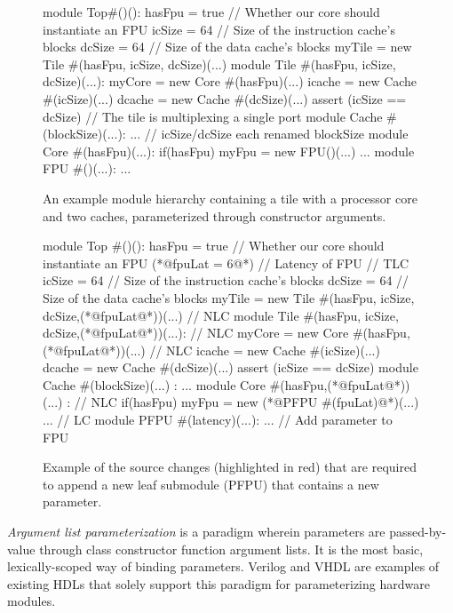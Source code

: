 \begin{figure}
\centering
\begin{phdl}
module Top#()():
  hasFpu = true  // Whether our core should instantiate an FPU
  icSize = 64    // Size of the instruction cache's blocks
  dcSize = 64    // Size of the data cache's blocks
  myTile = new Tile #(hasFpu, icSize, dcSize)(...)
module Tile #(hasFpu, icSize, dcSize)(...):
  myCore = new Core  #(hasFpu)(...)
  icache = new Cache #(icSize)(...)
  dcache = new Cache #(dcSize)(...)
  assert (icSize == dcSize)         // The tile is multiplexing a single port
module Cache #(blockSize)(...): ... // icSize/dcSize each renamed blockSize
module Core #(hasFpu)(...):
  if(hasFpu) myFpu = new FPU()(...) ...
module FPU #()(...): ...
\end{phdl} 
\caption[An example module hierarchy.]{
An example module hierarchy containing a tile with a processor core and two caches, parameterized through constructor arguments.}
\label{fig:arglist}
\end{figure}

\begin{figure}
\centering
\begin{phdl}
module Top #()():
  hasFpu = true  // Whether our core should instantiate an FPU
  (*@\textcolor[rgb]{1,0,0}{fpuLat = 6}@*)     // Latency of FPU                               // TLC
  icSize = 64    // Size of the instruction cache's blocks
  dcSize = 64    // Size of the data cache's blocks
  myTile = new Tile #(hasFpu, icSize, dcSize,(*@\textcolor[rgb]{1,0,0}{fpuLat}@*))(...)        // NLC
module Tile #(hasFpu, icSize, dcSize,(*@\textcolor[rgb]{1,0,0}{fpuLat}@*))(...):               // NLC
  myCore = new Core  #(hasFpu, (*@\textcolor[rgb]{1,0,0}{fpuLat}@*))(...)                      // NLC
  icache = new Cache #(icSize)(...)
  dcache = new Cache #(dcSize)(...)
  assert (icSize == dcSize) 
module Cache #(blockSize)(...) : ... 
module Core #(hasFpu,(*@\textcolor[rgb]{1,0,0}{fpuLat}@*))(...) :                              // NLC
  if(hasFpu) myFpu = new (*@\textcolor[rgb]{1,0,0}{PFPU \#(fpuLat)}@*)(...) ...                 // LC
module PFPU #(latency)(...): ...     // Add parameter to FPU 
\end{phdl}
\caption[Modifying the example with argument lists.]{Example of the source changes (highlighted in red) that are required to append a new leaf submodule (PFPU) that contains a new parameter.}
\label{fig:arglist-delta}
\end{figure}

\emph{Argument list parameterization} is a paradigm wherein parameters are passed-by-value through class constructor function argument lists. 
It is the most basic, lexically-scoped way of binding parameters.
Verilog and VHDL are examples of existing HDLs that solely support this paradigm for parameterizing hardware modules.
 
